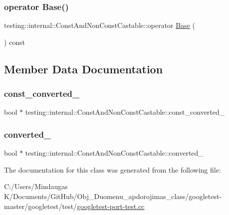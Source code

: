 \subsubsection{\texorpdfstring{operator Base()}{operator Base()}\hspace{0.1cm}{\footnotesize\ttfamily [6/6]}}
{\footnotesize\ttfamily testing\+::internal\+::\+Const\+And\+Non\+Const\+Castable\+::operator \mbox{\hyperlink{class_base}{Base}} (\begin{DoxyParamCaption}{ }\end{DoxyParamCaption}) const\hspace{0.3cm}{\ttfamily [inline]}}



\subsection{Member Data Documentation}
\mbox{\label{classtesting_1_1internal_1_1_const_and_non_const_castable_abd4a45b4894a88251fc1c64217e5d5a6}} 
\subsubsection{\texorpdfstring{const\_converted\_}{const\_converted\_}}
{\footnotesize\ttfamily bool $\ast$ testing\+::internal\+::\+Const\+And\+Non\+Const\+Castable\+::const\+\_\+converted\+\_\+\hspace{0.3cm}{\ttfamily [private]}}

\mbox{\label{classtesting_1_1internal_1_1_const_and_non_const_castable_a461ba0d85ebd9380c85c025f2c15a578}} 
\subsubsection{\texorpdfstring{converted\_}{converted\_}}
{\footnotesize\ttfamily bool $\ast$ testing\+::internal\+::\+Const\+And\+Non\+Const\+Castable\+::converted\+\_\+\hspace{0.3cm}{\ttfamily [private]}}



The documentation for this class was generated from the following file\+:\begin{DoxyCompactItemize}
\item 
C\+:/\+Users/\+Mindaugas K/\+Documents/\+Git\+Hub/\+Obj\+\_\+\+Duomenu\+\_\+apdorojimas\+\_\+class/googletest-\/master/googletest/test/\mbox{\hyperlink{googletest-master_2googletest_2test_2googletest-port-test_8cc}{googletest-\/port-\/test.\+cc}}\end{DoxyCompactItemize}
